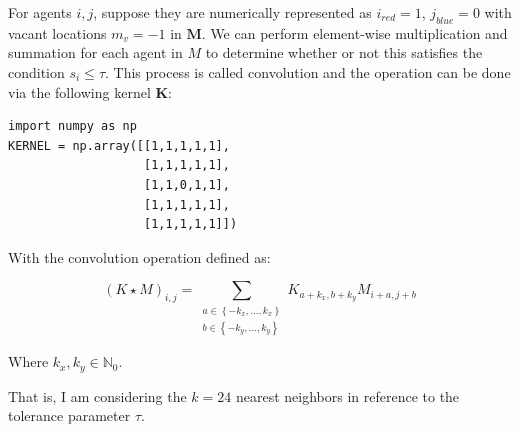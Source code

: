 \documentclass[../main.tex]{subfiles}
\begin{document}
For agents $i, j$, suppose they are numerically represented as $i_{red}=1$, $j_{blue} = 0$ with vacant locations $m_v=-1$ in $\textbf{M}$. We can perform element-wise multiplication and summation for each agent in $M$ to determine whether or not this satisfies the condition $s_i \leq \tau$. This process is called convolution and the operation can be done via the following kernel $\mathbf{K}$:

\begin{lstlisting}[style=pythonstyle]
import numpy as np
KERNEL = np.array([[1,1,1,1,1],
                   [1,1,1,1,1],
                   [1,1,0,1,1],
                   [1,1,1,1,1],
                   [1,1,1,1,1]])

\end{lstlisting}

With the convolution operation defined as:

\begin{equation}
(K \star M)_{i, j}=\sum_{\substack{a \in\left\{-k_x, \ldots, k_x\right\} \\ b \in\left\{-k_y, \ldots, k_y\right\}}} K_{a+k_x, b+k_y} M_{i+a, j+b}
\label{eq:convolution}
\end{equation}

Where $k_x, k_y \in \mathbb{N}_0$. 


That is, I am considering the $k=24$ nearest neighbors in reference to the tolerance parameter $\tau$.
\end{document}

